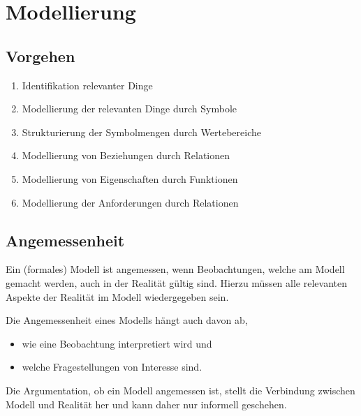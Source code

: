 
\chapter{Modellierung}
	\section{Vorgehen}
		\begin{enumerate}
			\item Identifikation relevanter Dinge
			\item Modellierung der relevanten Dinge durch Symbole
			\item Strukturierung der Symbolmengen durch Wertebereiche
			\item Modellierung von Beziehungen durch Relationen
			\item Modellierung von Eigenschaften durch Funktionen
			\item Modellierung der Anforderungen durch Relationen
		\end{enumerate}

	\section{Angemessenheit}
		Ein (formales) Modell ist angemessen, wenn Beobachtungen, welche am Modell gemacht werden, auch in der Realität gültig sind. Hierzu müssen alle relevanten Aspekte der Realität im Modell wiedergegeben sein.

		Die Angemessenheit eines Modells hängt auch davon ab,
		\begin{itemize}
			\item wie eine Beobachtung interpretiert wird und
			\item welche Fragestellungen von Interesse sind.
		\end{itemize}

		Die Argumentation, ob ein Modell angemessen ist, stellt die Verbindung zwischen Modell und Realität her und kann daher nur informell geschehen.

